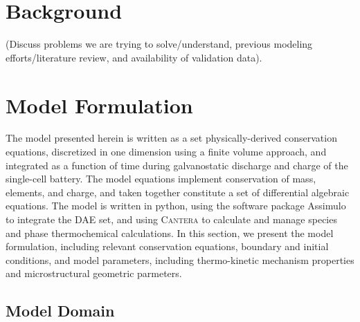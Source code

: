 \documentclass{elsarticle}
\begin{document}
\section{Background}

(Discuss problems we are trying to solve/understand, previous modeling efforts/literature review, and availability of validation data).





\section{Model Formulation}
The model presented herein is written as a set physically-derived conservation equations, discretized in one dimension using a finite volume approach, and integrated as a function of time during galvanostatic discharge and charge of the single-cell battery.  The model equations implement conservation of mass, elements, and charge, and taken together constitute a set of differential algebraic equations.  The model is written in python, using the software package Assimulo \cite{assimulo} to integrate the DAE set, and using \textsc{Cantera} \cite{cantera} to calculate and manage species and phase thermochemical calculations. In this section, we present the model formulation, including relevant conservation equations, boundary and initial conditions, and model parameters, including thermo-kinetic mechanism properties and microstructural geometric parmeters.

\subsection{Model Domain}
\end{document}
